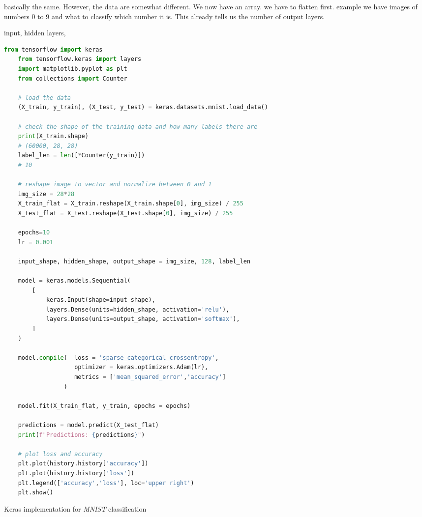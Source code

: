 basically the same. However, the data are somewhat different. We now have an array. we have to flatten first. example we have images of numbers 0 to 9 and what to classify which number it is. This already tells us the number of output layers.

input, hidden layers, 


\vspace{0.5cm}
\begin{algorithm}
	\begin{lstlisting}[language=Python]
	from tensorflow import keras
	from tensorflow.keras import layers
	import matplotlib.pyplot as plt
	from collections import Counter

	# load the data
	(X_train, y_train), (X_test, y_test) = keras.datasets.mnist.load_data()

	# check the shape of the training data and how many labels there are
	print(X_train.shape)
	# (60000, 28, 28)
	label_len = len([*Counter(y_train)])
	# 10

	# reshape image to vector and normalize between 0 and 1
	img_size = 28*28
	X_train_flat = X_train.reshape(X_train.shape[0], img_size) / 255
	X_test_flat = X_test.reshape(X_test.shape[0], img_size) / 255
	
	epochs=10
	lr = 0.001

	input_shape, hidden_shape, output_shape = img_size, 128, label_len

	model = keras.models.Sequential(
	    [
	        keras.Input(shape=input_shape),
	        layers.Dense(units=hidden_shape, activation='relu'),
	        layers.Dense(units=output_shape, activation='softmax'),
	    ]
	)

	model.compile(  loss = 'sparse_categorical_crossentropy', 
	                optimizer = keras.optimizers.Adam(lr), 
	                metrics = ['mean_squared_error','accuracy']
	             )
	
	model.fit(X_train_flat, y_train, epochs = epochs)

	predictions = model.predict(X_test_flat)
	print(f"Predictions: {predictions}")

	# plot loss and accuracy
	plt.plot(history.history['accuracy'])
	plt.plot(history.history['loss'])
	plt.legend(['accuracy','loss'], loc='upper right')  
	plt.show()
\end{lstlisting}
\caption[Keras implementation for \textit{MNIST} classification]{Keras implementation for \textit{MNIST} classification}
\label{alg:mnist_ann_keras}	
\end{algorithm}
\vspace{0.5cm}



